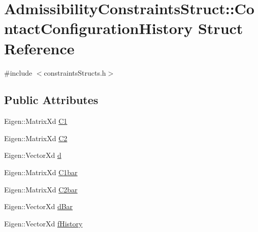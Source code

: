 \hypertarget{structAdmissibilityConstraintsStruct_1_1ContactConfigurationHistory}{\section{\-Admissibility\-Constraints\-Struct\-:\-:\-Contact\-Configuration\-History \-Struct \-Reference}
\label{structAdmissibilityConstraintsStruct_1_1ContactConfigurationHistory}
}


{\ttfamily \#include $<$constraints\-Structs.\-h$>$}

\subsection*{\-Public \-Attributes}
\begin{DoxyCompactItemize}
\item 
\-Eigen\-::\-Matrix\-Xd \hyperlink{structAdmissibilityConstraintsStruct_1_1ContactConfigurationHistory_a4111821b74104d00eb0c38e9177a5895}{\-C1}
\item 
\-Eigen\-::\-Matrix\-Xd \hyperlink{structAdmissibilityConstraintsStruct_1_1ContactConfigurationHistory_abd720b4028504806284818eab2e4c29a}{\-C2}
\item 
\-Eigen\-::\-Vector\-Xd \hyperlink{structAdmissibilityConstraintsStruct_1_1ContactConfigurationHistory_a6fa1f1664c5ac71f5d3ae1d0a4e95ec8}{d}
\item 
\-Eigen\-::\-Matrix\-Xd \hyperlink{structAdmissibilityConstraintsStruct_1_1ContactConfigurationHistory_ab80b3c301eae49e2c8705698c3e5dbc0}{\-C1bar}
\item 
\-Eigen\-::\-Matrix\-Xd \hyperlink{structAdmissibilityConstraintsStruct_1_1ContactConfigurationHistory_a61b1a4784607faf5a6bebd0422a215f8}{\-C2bar}
\item 
\-Eigen\-::\-Vector\-Xd \hyperlink{structAdmissibilityConstraintsStruct_1_1ContactConfigurationHistory_ab25463551bf094a25f5cf8a78fb1625b}{d\-Bar}
\item 
\-Eigen\-::\-Vector\-Xd \hyperlink{structAdmissibilityConstraintsStruct_1_1ContactConfigurationHistory_a24d268be0877f74053e771053327d08d}{f\-History}
\end{DoxyCompactItemize}


